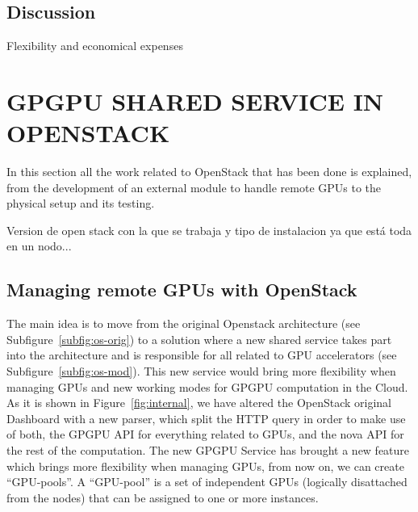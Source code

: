 \documentclass[a4paper,twoside]{article}
\begin{document}
\subsection{Discussion}
Flexibility and economical expenses

\section{\uppercase{GPGPU Shared Service in OpenStack}}
In this section all the work related to OpenStack that has been done is explained, from the development of an external module to handle remote GPUs to the physical setup and its testing.

Version de open stack con la que se trabaja y tipo de instalacion ya que está toda en un nodo...

\subsection{Managing remote GPUs with OpenStack}
The main idea is to move from the original Openstack architecture (see Subfigure~\ref{subfig:os-orig}) to a solution where a new shared service takes part into the architecture and is responsible for all related to GPU accelerators (see Subfigure~\ref{subfig:os-mod}).
This new service would bring more flexibility when managing GPUs and new working modes for GPGPU computation in the Cloud.
As it is shown in Figure~\ref{fig:internal}, we have altered the OpenStack original Dashboard with a new parser, 
which split the HTTP query in order to make use of both, the GPGPU API for everything related to GPUs, and the nova API for the rest of the computation. 
The new GPGPU Service has brought a new feature which brings more flexibility when managing GPUs, from now on, we can create ``GPU-pools''. 
A ``GPU-pool'' is a set of independent GPUs (logically disattached from the nodes) that can be assigned to one or more instances.
\end{document}
